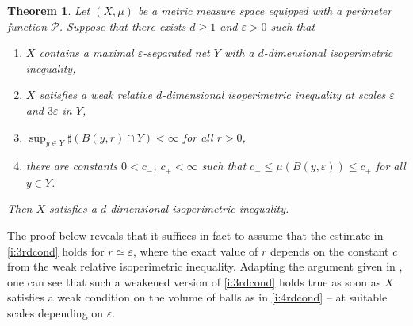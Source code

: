 \documentclass[10pt,letterpaper]{amsart}
\newtheorem{thm}{Theorem}
\theoremstyle{definition}
\numberwithin{thm}{subsection}
\numberwithin{equation}{section}
\begin{document}
\begin{thm}\label{t:globalIPgeneral}
Let $(X,\mu)$ be a metric measure space equipped with a perimeter function $\mathcal{P}$. Suppose that there exists $d\geq 1$ and $\varepsilon>0$ such that
\begin{enumerate}
\item\label{i:2rdcond} $X$ contains a maximal $\varepsilon$-separated net $Y$ with a $d$-dimensional isoperimetric inequality,
\item\label{i:1rdcond} $X$ satisfies a weak relative $d$-dimensional isoperimetric inequality at scales $\varepsilon$ and $3\varepsilon$ in $Y$,
\item\label{i:3rdcond} $\sup_{y \in Y} \sharp (B(y,r)\cap Y)<\infty$ for all $r>0$,
\item\label{i:4rdcond} there are constants $0<c_-$, $c_+ <\infty$ such that $c_- \leq \mu(B(y,\varepsilon)) \leq c_+$ for all $y\in Y$.
\end{enumerate}
Then $X$ satisfies a $d$-dimensional isoperimetric inequality.
\end{thm}

The proof below reveals that it suffices in fact to assume that the estimate in \eqref{i:3rdcond} holds for $r\simeq \varepsilon$, where the exact value of $r$ depends on the constant $c$ from the weak relative isoperimetric inequality. Adapting the argument given in \cite[Lemma 2.3]{MR792983}, one can see that such a weakened version of \eqref{i:3rdcond} holds true as soon as $X$ satisfies a weak condition on the volume of balls as in \eqref{i:4rdcond} -- at suitable scales depending on $\varepsilon$.
\end{document}
